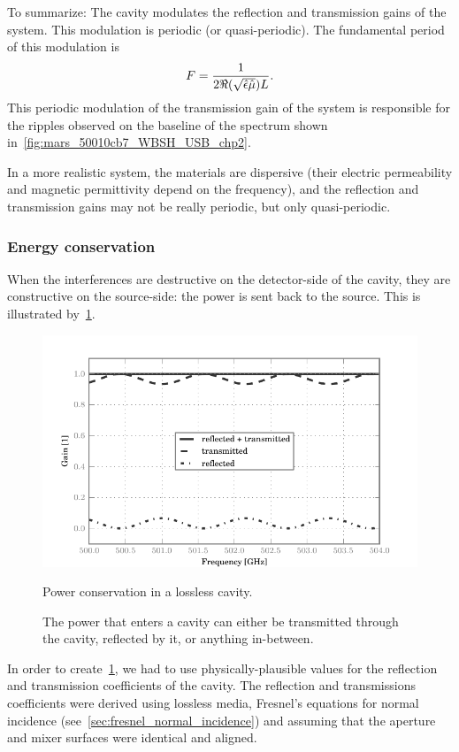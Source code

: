 To summarize:
The cavity modulates the reflection and transmission gains of the system.
This modulation is periodic (or quasi-periodic).
The fundamental period of this modulation is
\begin{equation}
    F = 
    \frac{1}{2\Re(\sqrt{\hat{\epsilon}\hat{\mu}})L}
    \text{.}
    \label{eq:relation_length_period_nice}
\end{equation}
This periodic modulation of the transmission gain of the system is responsible for the ripples observed on the baseline of the spectrum shown in~\cref{fig:mars_50010cb7_WBSH_USB_chp2}.

In a more realistic system, the materials are dispersive (their electric permeability and magnetic permittivity depend on the frequency), and the reflection and transmission gains may not be really periodic, but only quasi-periodic.




\subsubsection{Energy conservation}

When the interferences are destructive on the detector-side of the cavity, they are constructive on the source-side: the power is sent back to the source.
This is illustrated by~\cref{fig:cavity_energy_conservation}.
\begin{figure}[hbtp]
    \centering
    \includegraphics{cavity_energy_conservation}
    \caption{Power conservation in a lossless cavity.}
    \caption*{
        The power that enters a cavity can either be transmitted through the cavity, reflected by it, or anything in-between.
    }
    \label{fig:cavity_energy_conservation}
\end{figure}
In order to create~\cref{fig:cavity_energy_conservation}, we had to use physically-plausible values for the reflection and transmission coefficients of the cavity.
The reflection and transmissions coefficients were derived using lossless media, Fresnel's equations for normal incidence (see~\vref{sec:fresnel_normal_incidence})
and assuming that the aperture and mixer surfaces were identical and aligned.

